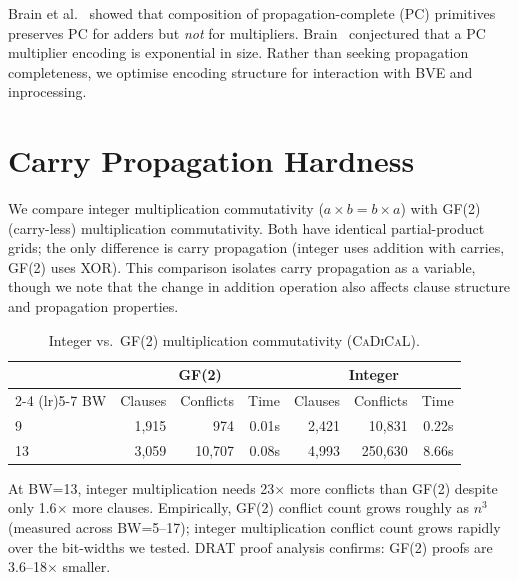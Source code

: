 \documentclass[a4paper]{ceurart}
\newcommand{\cadical}{\textsc{CaDiCaL}\xspace}
\begin{document}
Brain et al.~\cite{brain2016propagation} showed that composition of
propagation-complete (PC) primitives preserves PC for adders but
\emph{not} for multipliers. Brain~\cite{brain2021wrong} conjectured
that a PC multiplier encoding is exponential in size. Rather than
seeking propagation completeness, we optimise encoding structure for
interaction with BVE and inprocessing.

\section{Carry Propagation Hardness}
\label{sec:hardness}

We compare integer multiplication commutativity ($a \times b = b
\times a$) with GF(2) (carry-less) multiplication commutativity. Both
have identical partial-product grids; the only difference is carry
propagation (integer uses addition with carries, GF(2) uses XOR).
This comparison isolates carry propagation as a variable, though we
note that the change in addition operation also affects clause
structure and propagation properties.

\begin{table}[ht]
\caption{Integer vs.\ GF(2) multiplication commutativity (\cadical).}
\label{tab:gf2}
\centering
\begin{tabular}{lrrrrrr}
\toprule
& \multicolumn{3}{c}{GF(2)} & \multicolumn{3}{c}{Integer} \\
\cmidrule(lr){2-4} \cmidrule(lr){5-7}
BW & Clauses & Conflicts & Time & Clauses & Conflicts & Time \\
\midrule
9  & 1,915 & 974     & 0.01s & 2,421 & 10,831  & 0.22s \\
13 & 3,059 & 10,707  & 0.08s & 4,993 & 250,630 & 8.66s \\
\bottomrule
\end{tabular}
\end{table}

At BW=13, integer multiplication needs 23$\times$ more conflicts than
GF(2) despite only 1.6$\times$ more clauses. Empirically, GF(2)
conflict count grows roughly as $n^3$ (measured across BW=5--17);
integer multiplication conflict count grows rapidly over the
bit-widths we tested. DRAT proof analysis
confirms: GF(2) proofs are 3.6--18$\times$ smaller.
\end{document}
